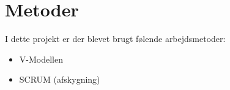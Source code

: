 \section{Metoder}

I dette projekt er der blevet brugt følende arbejdsmetoder:
\begin{itemize}
	\item V-Modellen
	\item SCRUM (afskygning)
	
\end{itemize}




